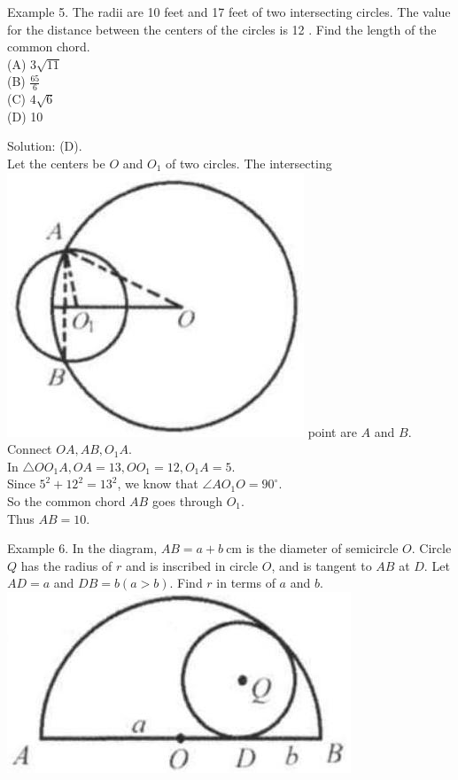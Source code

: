 \documentclass[10pt]{article}
\begin{document}
Example 5. The radii are 10 feet and 17 feet of two intersecting circles. The value for the distance between the centers of the circles is 12 . Find the length of the common chord.\\
(A) \(3 \sqrt{11}\)\\
(B) \(\frac{65}{6}\)\\
(C) \(4 \sqrt{6}\)\\
(D) 10

Solution: (D).\\
Let the centers be \(O\) and \(O_{1}\) of two circles. The intersecting\\
\includegraphics[max width=\textwidth]{2025_04_17_97bc1f7e44d93c271a88g-178} point are \(A\) and \(B\). Connect \(O A, A B, O_{1} A\).\\
In \(\triangle O O_{1} A, O A=13, O O_{1}=12, O_{1} A=5\).\\
Since \(5^{2}+12^{2}=13^{2}\), we know that \(\angle A O_{1} O=90^{\circ}\).\\
So the common chord \(A B\) goes through \(O_{1}\).\\
Thus \(A B=10\).

Example 6. In the diagram, \(A B=a+b \mathrm{~cm}\) is the diameter of semicircle \(O\). Circle \(Q\) has the radius of \(r\) and is inscribed in circle \(O\), and is tangent to \(A B\) at \(D\). Let \(A D=a\) and \(D B=b(a>b)\). Find \(r\) in terms of \(a\) and \(b\).\\
\includegraphics[max width=\textwidth, center]{2025_04_17_97bc1f7e44d93c271a88g-178(1)}
\end{document}
